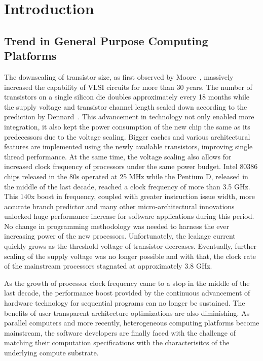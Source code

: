 \chapter{Introduction}
\label{chap1}
\section{Trend in General Purpose Computing Platforms}
The downscaling of transistor size, as first observed by Moore~\cite{Moore:2000:CMC:333067.333074}, massively increased the
capability of VLSI circuits for more than 30 years. The number of transistors on a single silicon die doubles approximately every 18 months while the supply voltage and transistor channel length scaled down according to the prediction by Dennard~\cite{dennard1974design}. This advancement in technology not only
enabled more integration, it also kept the power consumption of the new chip the same as its predecessors due to the voltage scaling. Bigger caches and
various architectural features are implemented using the newly available
transistors, improving single thread performance. At the same time, the voltage scaling also allows for increased clock frequency of processors under the same power budget. Intel 80386 chips released in the 80s operated at 25 MHz while the Pentium D, released in the middle of the last decade, reached
a clock frequency of more than 3.5 GHz. This 140x boost in frequency, coupled with
greater instruction issue width, more accurate branch predictor and many other
micro-architectural innovations unlocked huge performance increase for
software applications during this period. No change in programming methodology
was needed to harness the ever increasing power of the new processors.  Unfortunately, the leakage current quickly grows as the threshold voltage of transistor decreases. Eventually,
further scaling of the supply voltage was no longer possible and with that, the clock rate of the mainstream processors stagnated at approximately 3.8 GHz. 


As the growth of processor clock frequency came to a stop in the middle of the last decade,
the performance boost provided by the continuous advancement of hardware technology for sequential programs
can no longer be sustained. The benefits of user transparent architecture optimizations are also 
diminishing. As parallel computers and more recently, heterogeneous computing platforms become mainstream,
the software developers are finally faced with the challenge of matching their computation specifications
with the characterisitcs of the underlying compute substrate. 


